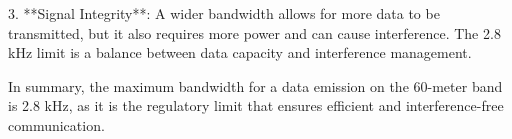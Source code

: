 3. **Signal Integrity**: A wider bandwidth allows for more data to be transmitted, but it also requires more power and can cause interference. The 2.8 kHz limit is a balance between data capacity and interference management.

In summary, the maximum bandwidth for a data emission on the 60-meter band is 2.8 kHz, as it is the regulatory limit that ensures efficient and interference-free communication.

